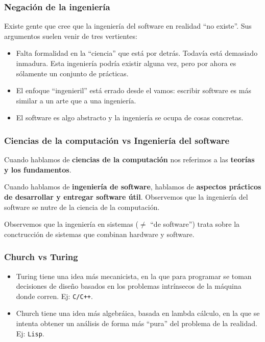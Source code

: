 \documentclass[]{article}
\begin{document}
\subsubsection{Negación de la ingeniería}
Existe gente que cree que la ingeniería del software en realidad ``no existe''. Sus argumentos suelen venir de tres vertientes:
\begin{itemize}
	\item Falta formalidad en la ``ciencia'' que está por detrás. Todavía está demasiado inmadura. Esta ingeniería podría existir alguna vez, pero por ahora es sólamente un conjunto de prácticas.
	\item El enfoque ``ingenieril'' está errado desde el vamos: escribir software es más similar a un arte que a una ingeniería.
	\item El software es algo abstracto y la ingeniería se ocupa de cosas concretas.
\end{itemize}

\subsubsection{Ciencias de la computación vs Ingeniería del software}
Cuando hablamos de \textbf{ciencias de la computación} nos referimos a las \textbf{teorías y los fundamentos}.

Cuando hablamos de \textbf{ingeniería de software}, hablamos de \textbf{aspectos prácticos de desarrollar y entregar software útil}. Observemos que la ingeniería del software se nutre de la ciencia de la computación.

Observemos que la ingeniería en sistemas ($\neq$ ``de software'') trata sobre la conctrucción de sistemas que combinan hardware y software.


\subsubsection{Church vs Turing}
\begin{itemize}
	\item Turing tiene una idea más mecanicista, en la que para programar se toman decisiones de diseño basados en los problemas intrínsecos de la máquina donde corren. Ej: \texttt{C/C++}.
	\item Church tiene una idea más algebráica, basada en lambda cálculo, en la que se intenta obtener un análisis de forma más ``pura'' del problema de la realidad. Ej: \texttt{Lisp}.
\end{itemize}
\end{document}
